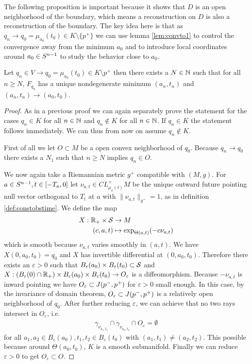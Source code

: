 The following proposition is important because it shows that $D$ is an open neighborhood of the boundary, which means a reconstruction on $D$ is also a reconstruction of the boundary. The key idea here is that as $q_n \to q_0=\mu_{a_0}(t_0)\in K \setminus \{p^+\}$ we can use lemma \ref{lem:convto1} to control the convergence away from the minimum $a_0$ and to introduce local coordinates around $a_0\in {S^{n-1}}$ to study the behavior close to $a_0$.
\begin{proposition}\label{prop:boundarymin}
    Let $q_n\in V\to q_0=\mu_{a_0}(t_0)\in K\setminus p^+$ then there exists a $N\in \mathbb{N}$ such that for all $n\ge N$, $F_{q_n}$ has a unique nondegenerate minimum $(a_n,t_n)$ and $(a_n,t_n)\to (a_0,t_0)$.
\end{proposition}
\begin{proof}
    As in a previous proof we can again separately prove the statement for the cases $q_n\in K$ for all $n\in \mathbb{N}$ and $q_n \notin K$ for all $n\in \mathbb{N}$. If $q_n \in K$ the statement follows immediately. We can thus from now on assume $q_n \notin K$.

    First of all we let $O\subset M$ be a open convex neighborhood of $q_0$. Because $q_n \to q_0$ there exists a $N_1$ such that $n\ge N$ implies $q_n \in O$.

    We now again take a Riemannian metric $g^+$ compatible with $(M,g)$. For $a\in {S^{n-1}}, t\in [-T_a,0]$ let $\nu_{a,t}\in CL^+_{\mu_a(t)}M$ be the unique outward future pointing null vector orthogonal to $T_t$ at $a$ with $\lVert \nu_{a,t} \rVert_{g^+}=1$, as in definition \ref{def:constobstime}. We define the map 
    \begin{align*}
        X:\mathbb{R}_+\times {\mathcal{S}} &\to M \\
        (c,a,t)&\mapsto \exp_{\Theta(a,t)}(-c\nu_{a,t})
    \end{align*} which is smooth because $\nu_{a,t}$ varies smoothly in $(a,t)$. We have $X(0,a_0,t_0)=q_0$ and $X$ has invertible differential at $(0,a_0,t_0)$. Therefore there exists an $\varepsilon>0$ such that $B_\varepsilon(a_0) \times B_\varepsilon(t_0)\subset {\mathcal{S}}$ and $X:(B_\varepsilon(0)\cap \mathbb{R}_+) \times B_\varepsilon(a_0) \times B_\varepsilon(t_0) \to O_\varepsilon$ is a diffeomorphism. Because $-\nu_{a,t}$ is inward pointing we have $O_\varepsilon\subset J(p^-,p^+)$ for $\varepsilon>0$ small enough. In this case, by the invariance of domain theorem, $O_\varepsilon\subset J(p^-,p^+)$ is a relatively open neighborhood of $q_0$. After further reducing $\varepsilon$, we can achieve that no two rays intersect in $O_\varepsilon$, i.e. 
    \begin{align*}
        \gamma_{\nu_{a_1,t_1}} \cap \gamma_{\nu_{a_2,t_2}} \cap O_\varepsilon=\emptyset
    \end{align*}
    for all $a_1,a_2\in B_\varepsilon(a_0), t_1,t_2 \in B_\varepsilon(t_0)$ with $(a_1,t_1)\neq (a_2,t_2)$.
    This possible because around $\Theta(a_0,t_0)$, $K$ is a smooth submanifold.
    Finally we can reduce $\varepsilon>0$ to get $O_\varepsilon\subset O$.
    

\end{proof}
